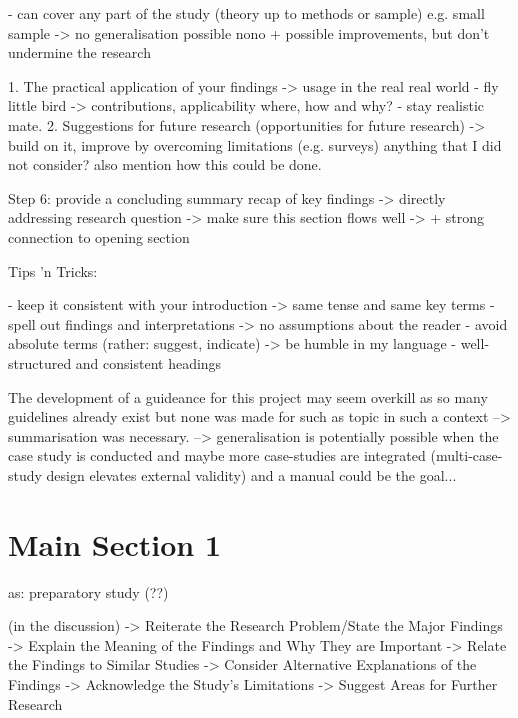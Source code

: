 
- can cover any part of the study (theory up to methods or sample)
e.g. small sample -> no generalisation possible nono
+ possible improvements, but don't undermine the research



1. The practical application of your findings -> usage in the real real world - fly little bird
-> contributions, applicability where, how and why? - stay realistic mate.
2. Suggestions for future research (opportunities for future research) -> build on it, improve by overcoming limitations (e.g. surveys)
anything that I did not consider? also mention how this could be done.

Step 6: provide a concluding summary
recap of key findings -> directly addressing research question
-> make sure this section flows well -> + strong connection to opening section

Tips 'n Tricks:

- keep it consistent with your introduction -> same tense and same key terms
- spell out findings and interpretations -> no assumptions about the reader
- avoid absolute terms (rather: suggest, indicate) -> be humble in my language
- well-structured and consistent headings







The development of a guideance for this project may seem overkill as so many guidelines already exist but none was made for such as topic in such a context --> summarisation was necessary. --> generalisation is potentially possible when the case study is conducted and maybe more case-studies are integrated (multi-case-study design elevates external validity) and a manual could be the goal... 


\section{Main Section 1}
as: preparatory study (??)


(in the discussion)
-> Reiterate the Research Problem/State the Major Findings
-> Explain the Meaning of the Findings and Why They are Important
-> Relate the Findings to Similar Studies
-> Consider Alternative Explanations of the Findings
-> Acknowledge the Study's Limitations
-> Suggest Areas for Further Research


